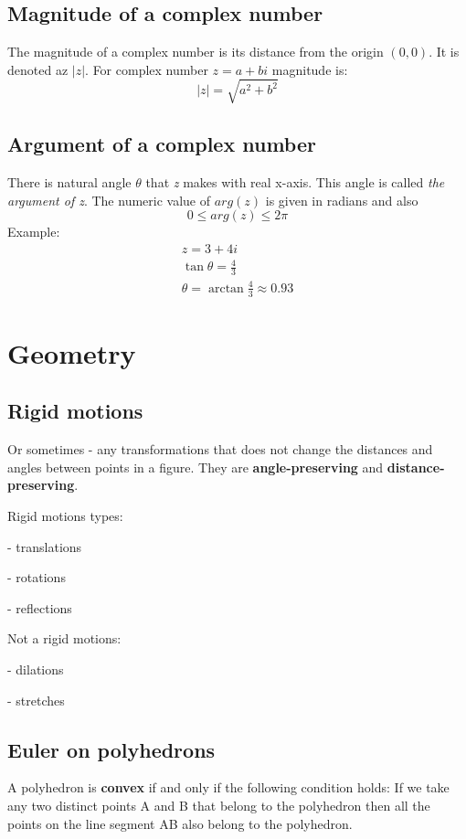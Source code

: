 \documentclass{article}
\begin{document}
\subsection{Magnitude of a complex number}
The magnitude of a complex number is its distance from the origin $(0, 0)$.
It is denoted az $|z|$. For complex number $z = a + bi$ magnitude is:
\begin{equation}
  |z| = \sqrt{a^2 + b^2}
\end{equation}

\subsection{Argument of a complex number}
There is natural angle $\theta$ that \textit{z} makes with real x-axis. This angle is called \textit{the argument of z}. The numeric value of $arg(z)$ is given in radians and also
\begin{equation}
  0 \leq arg(z) \leq 2\pi
\end{equation}
Example:
\begin{equation}
  \begin{gathered}
    z = 3 + 4i \\
    \tan \theta = \frac{4}{3} \\
    \theta = \arctan\frac{4}{3} \approx 0.93
  \end{gathered}
\end{equation}

\section{Geometry}
\subsection{Rigid motions}
Or sometimes - any transformations that does not change the distances
and angles between points in a figure. They are \textbf{angle-preserving} and
\textbf{distance-preserving}.


Rigid motions types:

- translations

- rotations

- reflections


Not a rigid motions:

- dilations

- stretches

\subsection{Euler on polyhedrons}
A polyhedron is \textbf{convex} if and only if the following condition
holds:
If we take any two distinct points A and B that belong to the polyhedron
then all the points on the line segment AB also belong to the polyhedron.
\end{document}
